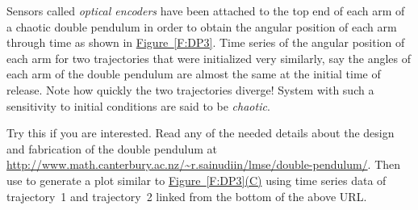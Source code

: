 Sensors called {\em optical encoders} have been attached to the top end of each arm of a chaotic double pendulum in order to obtain the angular position of each arm through time as shown in \hyperref[F:DP3]{Figure~\ref*{F:DP3}}.  Time series of the angular position of each arm for two trajectories that were initialized very similarly, say the angles of each arm of the double pendulum are almost the same at the initial time of release.  Note how quickly the two trajectories diverge!  System with such a sensitivity to initial conditions are said to be {\em chaotic}.

\begin{labwork}\label{LW:DPtrajectoryparsing}  Try this if you are interested.  Read any of the needed details about the design and fabrication of  the double pendulum at \href{http://www.math.canterbury.ac.nz/~r.sainudiin/lmse/double-pendulum/}{\url{http://www.math.canterbury.ac.nz/~r.sainudiin/lmse/double-pendulum/}}.  Then use \Matlab to generate a plot similar to \hyperref[F:DP3]{Figure~\ref*{F:DP3}(C)} using time series data of {\sf trajectory~1} and {\sf  trajectory~2} linked from the bottom of the above URL.
 \end{labwork}









